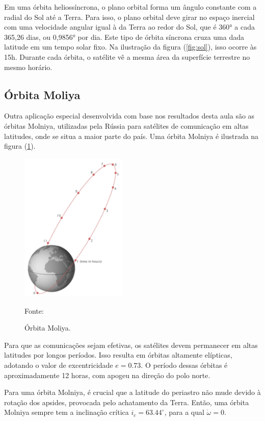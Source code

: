 \par Em uma órbita heliossíncrona, o plano orbital forma um ângulo constante com a radial do Sol até a Terra. Para isso, o plano orbital deve girar no espaço inercial com uma velocidade angular igual à da Terra ao redor do Sol, que é 360° a cada 365,26 dias, ou 0,9856° por dia. Este tipo de órbita síncrona cruza uma dada latitude em um tempo solar fixo. Na ilustração da figura (\ref{fig:sol}), isso ocorre às 15h. Durante cada órbita, o satélite vê a mesma área da superfície terrestre no mesmo horário. 

\subsection{Órbita Moliya}
\par Outra aplicação especial desenvolvida com base nos resultados desta aula são as órbitas Molniya, utilizadas pela Rússia para satélites de comunicação em altas latitudes, onde se situa a maior parte do país. Uma órbita Molniya é ilustrada na figura (\ref{fig:mol}).

\begin{figure}[h]
        \centering
        \includegraphics[width=2in]{figuras/mol.png}
        \caption{Órbita Moliya.}
        \footnotesize Fonte: \cite{livro:andre}
        \label{fig:mol}
\end{figure} 

\par Para que as comunicações sejam efetivas, os satélites devem permanecer em altas latitudes por longos períodos. Isso resulta em órbitas altamente elípticas, adotando o valor de excentricidade $e = 0.73$. O período dessas órbitas é aproximadamente 12 horas, com apogeu na direção do polo norte.

\par Para uma órbita Molniya, é crucial que a latitude do periastro não mude devido à rotação dos apsides, provocada pelo achatamento da Terra. Então, uma órbita Molniya sempre tem a inclinação crítica $i_c = 63.44^\circ$, para a qual $\dot{\omega} = 0$.

